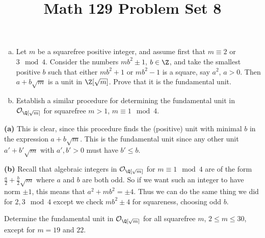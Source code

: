 \documentclass[11pt,letterpaper]{article}
\title{\textbf{Math 129 Problem Set 8}}
\begin{document}
\maketitle


\begin{cproblem}{5.33}\noindent
    \begin{enumerate}[(a)]
        \item Let $m$ be a squarefree positive integer, and assume first that $m\equiv 2$ or $3\mod 4$. Consider the numbers $mb^2\pm 1$, $b\in \Z$, and take the smallest positive $b$ such that either $mb^2+1$ or $mb^2-1$ is a square, say $a^2$, $a>0$. Then $a+b\sqrt{m}$ is a unit in $\Z[\sqrt{m}]$. Prove that it is the fundamental unit. %
        \item Establish a similar procedure for determining the fundamental unit in $\mathcal{O}_{\Q[\sqrt{m}]}$ for squarefree $m>1$, $m\equiv 1\mod 4$. %
    \end{enumerate}
\end{cproblem}

\begin{solution}
    \textbf{(a)} This is clear, since this procedure finds the (positive) unit with minimal $b$ in the expression $a+b\sqrt{m}$. This is the fundamental unit since any other unit $a'+b'\sqrt{m}$ with $a',b'>0$ must have $b'\leq b$. 
    
    \textbf{(b)} Recall that algebraic integers in $\mathcal{O}_{\Q[\sqrt{m}]}$ for $m\equiv 1\mod 4$ are of the form $\frac{a}{2}+\frac{b}{2}\sqrt{m}$ where $a$ and $b$ are both odd. So if we want such an integer to have norm $\pm 1$, this means that $a^2+mb^2=\pm 4$. Thus we can do the same thing we did for $2,3\mod 4$ except we check $mb^2\pm 4$ for squareness, choosing odd $b$.
\end{solution}

\begin{cproblem}{5.34}
    Determine the fundamental unit in $\mathcal{O}_{\Q[\sqrt{m}]}$ for all squarefree $m$, $2\leq m\leq 30$, except for $m=19$ and $22$. 
\end{cproblem}
\end{document}
